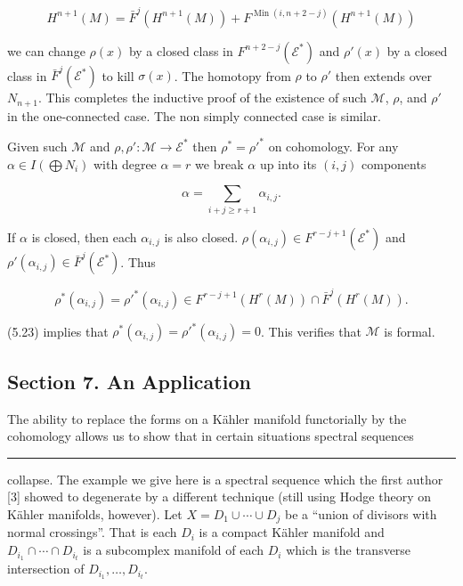 \documentclass[
  english,
  a3paper,
  a3paper]{extarticle}
\begin{document}
\[H^{n+1}(M)=\bar F^j(H^{n+1}(M))+F^{\operatorname{Min}(i,n+2-j)}(H^{n+1}(M))\]

we can change \(\rho(x)\) by a closed class in
\(F^{n+2-j}(\mathcal{E}^*)\) and \(\rho'(x)\) by a closed class in
\(\bar F^j(\mathcal{E}^*)\) to kill \(\sigma(x)\). The homotopy from
\(\rho\) to \(\rho'\) then extends over \(N_{n+1}\). This completes the
inductive proof of the existence of such \(\mathcal{M}\), \(\rho\), and
\(\rho'\) in the one-connected case. The non simply connected case is
similar.

Given such \(\mathcal{M}\) and
\(\rho,\rho':\mathcal{M}\to\mathcal{E}^*\) then \(\rho^*=\rho'^*\) on
cohomology. For any \(\alpha\in I(\bigoplus N_i)\) with degree
\(\alpha=r\) we break \(\alpha\) up into its \((i,j)\) components

\[\alpha=\sum_{i+j\geq r+1}\alpha_{i,j}.\]

If \(\alpha\) is closed, then each \(\alpha_{i,j}\) is also closed.
\(\rho(\alpha_{i,j})\in F^{r-j+1}(\mathcal{E}^*)\) and
\(\rho'(\alpha_{i,j})\in\bar F^j(\mathcal{E}^*)\). Thus

\[\rho^*(\alpha_{i,j})=\rho'^*(\alpha_{i,j})\in F^{r-j+1}(H^r(M))\cap\bar F^j(H^r(M)).\]

(5.23) implies that \(\rho^*(\alpha_{i,j})=\rho'^*(\alpha_{i,j})=0\).
This verifies that \(\mathcal{M}\) is formal.

\subsection{Section 7. An Application}\label{section-7.-an-application}

The ability to replace the forms on a Kähler manifold functorially by
the cohomology allows us to show that in certain situations spectral
sequences

\clearpage



\par

\vspace{0.7mm}\hrule\vspace{1.6mm}

\fontsize{9}{11}\selectfont

collapse. The example we give here is a spectral sequence which the
first author {[}3{]} showed to degenerate by a different technique
(still using Hodge theory on Kähler manifolds, however). Let
\(X=D_1\cup\cdots\cup D_j\) be a ``union of divisors with normal
crossings''. That is each \(D_i\) is a compact Kähler manifold and
\(D_{i_1}\cap\cdots\cap D_{i_t}\) is a subcomplex manifold of each
\(D_i\) which is the transverse intersection of
\(D_{i_1},\ldots,D_{i_t}\).
\end{document}
